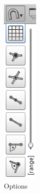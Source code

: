 \documentclass[a4paper,11pt]{report}
\begin{document}
\begin{minipage}[h]{4cm}
\begin{figure}[H]
\begin{center}
\includegraphics[scale=0.6]{../pictures/snap_opt.png}
\caption{Options}
\label{pic:snap_opt}
\end{center}
\end{figure}
\end{minipage}
\end{document}
